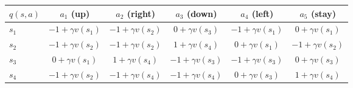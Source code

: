 \documentclass[11pt, letterpaper]{article}
\theoremstyle{runin}
\theoremstyle{runinplain}
\theoremstyle{remark}
\begin{document}
\begin{center}
\small
\begin{tabular}{@{}lccccc@{}}
\toprule
$q(s,a)$ & $a_1$ (up) & $a_2$ (right) & $a_3$ (down) & $a_4$ (left) & $a_5$ (stay)\\
\midrule
$s_1$ & $-1+\gamma v(s_1)$ & $-1+\gamma v(s_2)$ & $0+\gamma v(s_3)$ & $-1+\gamma v(s_1)$ & $0+\gamma v(s_1)$\\
$s_2$ & $-1+\gamma v(s_2)$ & $-1+\gamma v(s_2)$ & $1+\gamma v(s_4)$ & $0+\gamma v(s_1)$ & $-1+\gamma v(s_2)$\\
$s_3$ & $0+\gamma v(s_1)$ & $1+\gamma v(s_4)$ & $-1+\gamma v(s_3)$ & $-1+\gamma v(s_3)$ & $0+\gamma v(s_3)$\\
$s_4$ & $-1+\gamma v(s_2)$ & $-1+\gamma v(s_4)$ & $-1+\gamma v(s_4)$ & $0+\gamma v(s_3)$ & $1+\gamma v(s_4)$\\
\bottomrule
\end{tabular}
\end{center}
\end{document}
